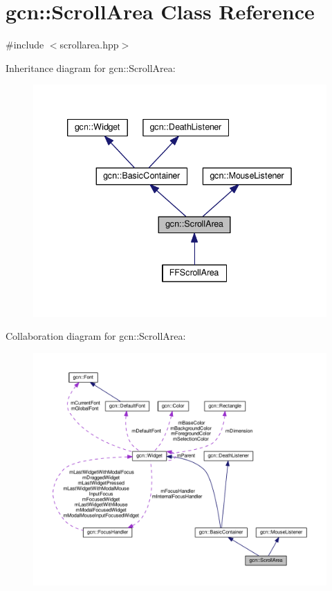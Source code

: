 \hypertarget{classgcn_1_1ScrollArea}{}\section{gcn\+:\+:Scroll\+Area Class Reference}
\label{classgcn_1_1ScrollArea}


{\ttfamily \#include $<$scrollarea.\+hpp$>$}



Inheritance diagram for gcn\+:\+:Scroll\+Area\+:\nopagebreak
\begin{figure}[H]
\begin{center}
\leavevmode
\includegraphics[width=339pt]{classgcn_1_1ScrollArea__inherit__graph}
\end{center}
\end{figure}


Collaboration diagram for gcn\+:\+:Scroll\+Area\+:\nopagebreak
\begin{figure}[H]
\begin{center}
\leavevmode
\includegraphics[width=350pt]{classgcn_1_1ScrollArea__coll__graph}
\end{center}
\end{figure}
